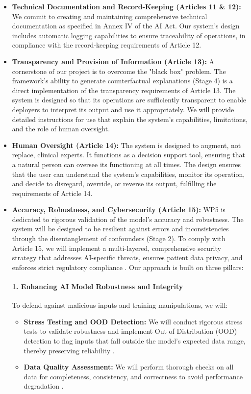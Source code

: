 \documentclass[11pt, a4paper]{article}
\begin{document}
\begin{itemize}
    \item \textbf{Technical Documentation and Record-Keeping (Articles 11 \& 12):} We commit to creating and maintaining comprehensive technical documentation as specified in Annex IV of the AI Act. Our system's design includes automatic logging capabilities to ensure traceability of operations, in compliance with the record-keeping requirements of Article 12.

    \item \textbf{Transparency and Provision of Information (Article 13):} A cornerstone of our project is to overcome the "black box" problem. The framework's ability to generate counterfactual explanations (Stage 4) is a direct implementation of the transparency requirements of Article 13. The system is designed so that its operations are sufficiently transparent to enable deployers to interpret its output and use it appropriately. We will provide detailed instructions for use that explain the system's capabilities, limitations, and the role of human oversight.

    \item \textbf{Human Oversight (Article 14):} The system is designed to augment, not replace, clinical experts. It functions as a decision support tool, ensuring that a natural person can oversee its functioning at all times. The design ensures that the user can understand the system's capabilities, monitor its operation, and decide to disregard, override, or reverse its output, fulfilling the requirements of Article 14.

    \item \textbf{Accuracy, Robustness, and Cybersecurity (Article 15):} WP5 is dedicated to rigorous validation of the model's accuracy and robustness. The system will be designed to be resilient against errors and inconsistencies through the disentanglement of confounders (Stage 2). To comply with Article 15, we will implement a multi-layered, comprehensive security strategy that addresses AI-specific threats, ensures patient data privacy, and enforces strict regulatory compliance \cite{AlAttar2023,AlkanZakariyya2025}. Our approach is built on three pillars:

\paragraph{1. Enhancing AI Model Robustness and Integrity}
To defend against malicious inputs and training manipulations, we will:
\begin{itemize}
    \item \textbf{Stress Testing and OOD Detection:} We will conduct rigorous stress tests to validate robustness and implement Out-of-Distribution (OOD) detection to flag inputs that fall outside the model's expected data range, thereby preserving reliability \cite{KhadkaEpiphaniou2025}.
    \item \textbf{Data Quality Assessment:} We will perform thorough checks on all data for completeness, consistency, and correctness to avoid performance degradation \cite{GarcaGmezBlanesSelva2023}.
\end{itemize}


\end{itemize}
\end{document}
